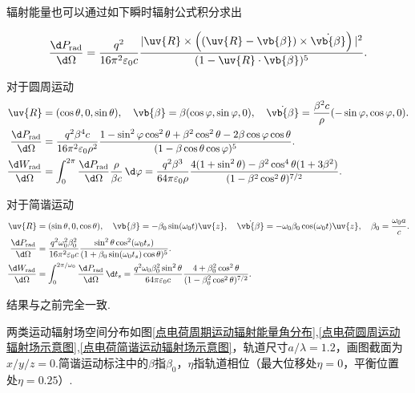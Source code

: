\begin{notes}
	辐射能量也可以通过如下瞬时辐射公式积分求出

	\begin{equation*}
		\frac{\d  P_{\mathrm{rad}}}{\d \Omega} = \frac{q^{2}}{16\pi^{2} \varepsilon_{0} c} \frac{| \uv{R} \times \left( (\uv{R} - \vb{\beta}) \times \dot{\vb{\beta}} \right) |^{2}}{(1 - \uv{R} \cdot \vb{\beta})^{5}}.
	\end{equation*}

	对于圆周运动
	\begin{align*}
		\uv{R} &= (\cos\theta, 0, \sin\theta), \quad
		\vb{\beta} = \beta (\cos\varphi, \sin\varphi, 0), \quad
		\dot{\vb{\beta}} = \frac{\beta^{2} c}{\rho} (-\sin\varphi, \cos\varphi, 0). \\
		\frac{\d  P_{\mathrm{rad}}}{\d \Omega} &= \frac{q^{2} \beta^{4} c}{16\pi^{2} \varepsilon_{0} \rho^{2}} \frac{1 - \sin^{2}\varphi \cos^{2}\theta + \beta^{2} \cos^{2}\theta - 2\beta \cos\varphi \cos\theta}{(1 - \beta \cos\theta \cos\varphi)^{5}}. \\
		\frac{\d  W_{\mathrm{rad}}}{\d \Omega} &= \int_{0}^{2\pi} \frac{\d  P_{\mathrm{rad}}}{\d \Omega} \frac{\rho}{\beta c} \, \d \varphi = \frac{q^{2} \beta^{3}}{64\pi \varepsilon_{0} \rho} \frac{4(1 + \sin^{2}\theta) - \beta^{2} \cos^{4}\theta (1 + 3\beta^{2})}{(1 - \beta^{2} \cos^{2}\theta)^{7/2}}.
	\end{align*}

	对于简谐运动
	\begin{align*}
		\uv{R} &= (\sin\theta, 0, \cos\theta), \quad
		\vb{\beta} = -\beta_{0} \sin(\omega_{0} t) \uv{z}, \quad
		\dot{\vb{\beta}} = -\omega_{0} \beta_{0} \cos(\omega_{0} t) \uv{z}, \quad
		\beta_{0} = \frac{\omega_{0} a}{c}. \\
		\frac{\d  P_{\mathrm{rad}}}{\d \Omega} &= \frac{q^{2} \omega_{0}^{2} \beta_{0}^{2}}{16\pi^{2} \varepsilon_{0} c} \frac{\sin^{2}\theta \cos^{2}(\omega_{0} t_{s})}{(1 + \beta_{0} \sin(\omega_{0} t_{s}) \cos\theta)^{5}}. \\
		\frac{\d  W_{\mathrm{rad}}}{\d \Omega} &= \int_{0}^{2\pi/\omega_{0}} \frac{\d  P_{\mathrm{rad}}}{\d \Omega} \, \d t_{s} = \frac{q^{2} \omega_{0} \beta_{0}^{2} \sin^{2}\theta}{64\pi \varepsilon_{0} c} \frac{4 + \beta_{0}^{2} \cos^{2}\theta}{(1 - \beta_{0}^{2} \cos^{2}\theta)^{7/2}}.
	\end{align*}

	结果与之前完全一致.

	两类运动辐射场空间分布如图\ref{点电荷周期运动辐射能量角分布},\ref{点电荷圆周运动辐射场示意图},\ref{点电荷简谐运动辐射场示意图}，轨道尺寸\(a/\lambda=1.2\)，画图截面为\(x/y/z=0\).简谐运动标注中的\(\beta\)指\(\beta_0\)，\(\eta\)指轨道相位（最大位移处\(\eta=0\)，平衡位置处\(\eta=0.25\)）.
\end{notes}

